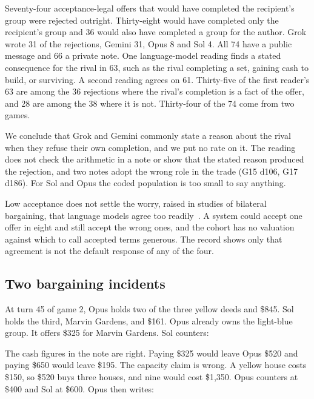 Seventy-four acceptance-legal offers that would have completed the recipient's group were rejected outright. Thirty-eight would have completed only the recipient's group and 36 would also have completed a group for the author. Grok wrote 31 of the rejections, Gemini 31, Opus 8 and Sol 4. All 74 have a public message and 66 a private note. One language-model reading finds a stated consequence for the rival in 63, such as the rival completing a set, gaining cash to build, or surviving. A second reading agrees on 61. Thirty-five of the first reader's 63 are among the 36 rejections where the rival's completion is a fact of the offer, and 28 are among the 38 where it is not. Thirty-four of the 74 come from two games.

We conclude that Grok and Gemini commonly state a reason about the rival when they refuse their own completion, and we put no rate on it. The reading does not check the arithmetic in a note or show that the stated reason produced the rejection, and two notes adopt the wrong role in the trade (G15 d106, G17 d186). For Sol and Opus the coded population is too small to say anything.

Low acceptance does not settle the worry, raised in studies of bilateral bargaining, that language models agree too readily~\cite{cosentino2026counterparty,shah2025rationalis}. A system could accept one offer in eight and still accept the wrong ones, and the cohort has no valuation against which to call accepted terms generous. The record shows only that agreement is not the default response of any of the four.

\subsection{Two bargaining incidents}


At turn 45 of game 2, Opus holds two of the three yellow deeds and \$845. Sol holds the third, Marvin Gardens, and \$161. Opus already owns the light-blue group. It offers \$325 for Marvin Gardens. Sol counters:



The cash figures in the note are right. Paying \$325 would leave Opus \$520 and paying \$650 would leave \$195. The capacity claim is wrong. A yellow house costs \$150, so \$520 buys three houses, and nine would cost \$1,350. Opus counters at \$400 and Sol at \$600. Opus then writes:

